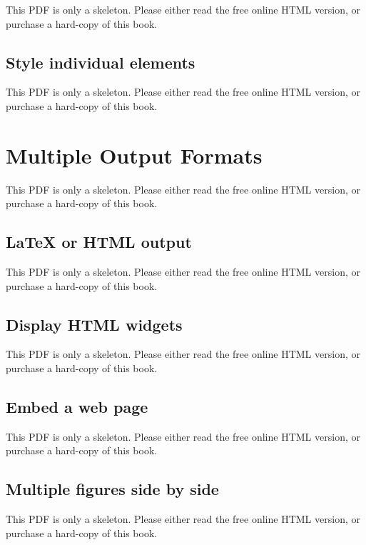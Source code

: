 \documentclass[
  11pt,
]{krantz}
\begin{document}
This PDF is only a skeleton. Please either read the free online HTML version, or purchase a hard-copy of this book.

\section{Style individual elements}\label{word-officedown}

This PDF is only a skeleton. Please either read the free online HTML version, or purchase a hard-copy of this book.

\chapter{Multiple Output Formats}\label{multi-formats}

This PDF is only a skeleton. Please either read the free online HTML version, or purchase a hard-copy of this book.

\section{LaTeX or HTML output}\label{latex-html}

This PDF is only a skeleton. Please either read the free online HTML version, or purchase a hard-copy of this book.

\section{Display HTML widgets}\label{html-widgets}

This PDF is only a skeleton. Please either read the free online HTML version, or purchase a hard-copy of this book.

\section{Embed a web page}\label{include-url}

This PDF is only a skeleton. Please either read the free online HTML version, or purchase a hard-copy of this book.

\section{Multiple figures side by side}\label{figures-side}

This PDF is only a skeleton. Please either read the free online HTML version, or purchase a hard-copy of this book.
\end{document}
